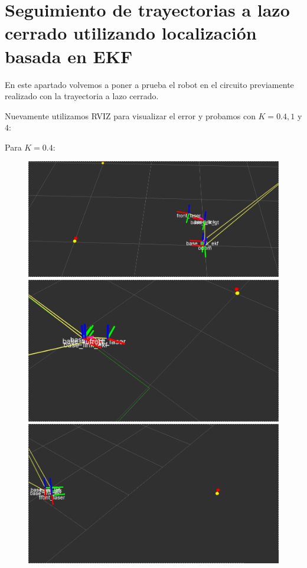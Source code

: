 \section{Seguimiento de trayectorias a lazo cerrado utilizando localización basada en EKF}

En este apartado volvemos a poner a prueba el robot en el circuito previamente realizado con la trayectoria a lazo cerrado.

Nuevamente utilizamos RVIZ para visualizar el error y probamos con $K= 0.4,1$ y $4$:

Para $K=0.4$:

\begin{figure}[!htb]
  \includegraphics[width=\linewidth]{imagenesEKF/k0.4/1.png}
\endminipage\hfill
{}
  \includegraphics[width=\linewidth]{imagenesEKF/k0.4/2.png}
\endminipage\hfill
{}%
  \includegraphics[width=\linewidth]{imagenesEKF/k0.4/3.png}
\endminipage
\end{figure}

